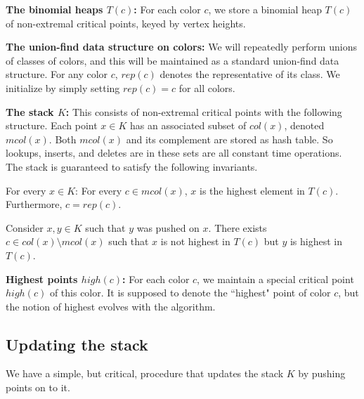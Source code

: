 \documentclass[11pt]{article}
\theoremstyle{definition}
\newcommand{\col}{col}
\newcommand{\h}{high}
\newcommand{\mcol}{mcol}
\newcommand{\rep}{rep}
\newcommand{\st}{K}
\newcommand{\touch}{T}
\begin{document}
\medskip
\noindent
{\bf The binomial heaps $\touch(c)$:} For each color $c$, we store a binomial
heap $T(c)$ of non-extremal critical points, keyed by vertex heights.

\medskip
\noindent
{\bf The union-find data structure on colors:} We will repeatedly perform unions
of classes of colors, and this will be maintained as a standard union-find data structure.
For any color $c$, $\rep(c)$ denotes the representative of its class. We initialize
by simply setting $\rep(c) = c$ for all colors.


\medskip
\noindent
{\bf The stack $\st$:} This consists of non-extremal critical points with the following structure.
Each point $x \in \st$ has an associated subset of $\col(x)$, denoted $\mcol(x)$.
Both $\mcol(x)$ and its complement are stored as hash table. So lookups, inserts, and deletes
are in these sets are all constant time operations. The stack is guaranteed to satisfy 
the following invariants.
\begin{asparaitem}
	\item For every $x \in \st$: For every $c \in \mcol(x)$, $x$ is the highest element
	in $T(c)$. Furthermore, $c = \rep(c)$.
	\item Consider $x, y \in \st$ such that $y$ was pushed on $x$. There exists $c \in \col(x) \setminus
	\mcol(x)$ such that $x$ is not highest in $T(c)$ but $y$ is highest in $T(c)$.
\end{asparaitem}

\medskip
\noindent
{\bf Highest points $\h(c)$:} For each color $c$, we maintain a special critical point $\h(c)$ of this color.
It is supposed to denote the ``highest" point of color $c$, but the notion of highest evolves
with the algorithm. 

\subsection{Updating the stack} \label{sec:stack}

We have a simple, but critical, procedure that updates the stack $\st$ by pushing
points on to it.
\end{document}
